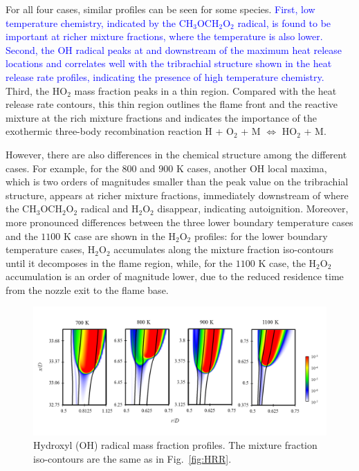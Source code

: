 \documentclass[review,3p,times]{elsarticle}
\begin{document}
For all four cases, similar profiles can be seen for some species.  \textcolor{blue}{First, low temperature chemistry, indicated by the CH$_3$OCH$_2$O$_2$ radical, is found to be important at richer mixture fractions, where the temperature is also lower.  Second, the OH radical peaks at and downstream of the maximum heat release locations and correlates well with the tribrachial structure shown in the heat release rate profiles, indicating the presence of high temperature chemistry.}  Third, the HO$_2$ mass fraction peaks in a thin region.  Compared with the heat release rate contours, this thin region outlines the flame front and the reactive mixture at the rich mixture fractions and indicates the importance of the exothermic three-body recombination reaction H + O$_2$ + M $\Longleftrightarrow$ HO$_2$ + M.


However, there are also differences in the chemical structure among the different cases.  For example, for the $800$ and $900$ K cases, another OH local maxima, which is two orders of magnitudes smaller than the peak value on the tribrachial structure, appears at richer mixture fractions, immediately downstream of where the CH$_3$OCH$_2$O$_2$ radical and H$_2$O$_2$ disappear, indicating autoignition.  Moreover, more pronounced differences between the three lower boundary temperature cases and the $1100$ K case are shown in the H$_2$O$_2$ profiles: for the lower boundary temperature cases, H$_2$O$_2$ accumulates along the mixture fraction iso-contours  until it decomposes in the flame region, while, for the $1100$ K case, the H$_2$O$_2$ accumulation is an order of magnitude lower, due to the reduced residence time from the nozzle exit to the flame base.
  

\begin{figure}[t]
  \centering
  \scriptsize
  \vspace{-0.1in}
  \includegraphics[width=1.0\textwidth]{OH.png}
  \normalsize
  \vspace{-0.1in}
  \caption{Hydroxyl (OH) radical mass fraction profiles.  The mixture fraction iso-contours are the same as in Fig.~\ref{fig:HRR}.}
  \label{fig:OH}
\end{figure}
\end{document}
